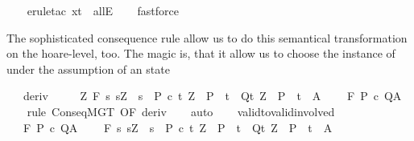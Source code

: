 \begin{isabellebody}
\ \ \isamarkupfalse%
\ {\isacharparenleft}erule{\isacharunderscore}tac\ x{\isacharequal}t\ \ allE{\isacharparenright}\isanewline
\ \ \isamarkupfalse%
\ fastforce\isanewline
\ \ \isamarkupfalse%
%
\endisatagproof
{\isafoldproof}%
%
\isadelimproof
%
\endisadelimproof
%
\begin{isamarkuptext}%
The sophisticated consequence rule allow us to do this 
        semantical transformation on the hoare-level, too. 
        The magic is, that it allow us to
        choose the instance of  under the assumption of an state %
\end{isamarkuptext}\isamarkuptrue%
\isamarkupfalse%
\isanewline
\ \ \ deriv{\isacharcolon}\ \isanewline
\ \ \ \ {\isachardoublequoteopen}{\isasymforall}Z{\isachardot}\ {\isasymGamma}{\isacharcomma}{\isacharbraceleft}{\isacharbraceright}{\isasymturnstile}\isactrlbsub {\isacharslash}F\isactrlesub \ {\isacharbraceleft}s{\isachardot}\ s{\isacharequal}Z\ {\isasymand}\ s\ {\isasymin}\ P{\isacharbraceright}\ c\ {\isacharbraceleft}t{\isachardot}\ Z\ {\isasymin}\ P\ {\isasymlongrightarrow}\ t\ {\isasymin}\ Q{\isacharbraceright}{\isacharcomma}{\isacharbraceleft}t{\isachardot}\ Z\ {\isasymin}\ P\ {\isasymlongrightarrow}\ t\ {\isasymin}\ A{\isacharbraceright}{\isachardoublequoteclose}\isanewline
\ \ \ {\isachardoublequoteopen}{\isasymGamma}{\isacharcomma}{\isacharbraceleft}{\isacharbraceright}\ {\isasymturnstile}\isactrlbsub {\isacharslash}F\isactrlesub \ P\ c\ Q{\isacharcomma}A{\isachardoublequoteclose}\isanewline
%
\isadelimproof
\ \ %
\endisadelimproof
%
\isatagproof
{}\isamarkupfalse%
\ {\isacharparenleft}rule\ ConseqMGT\ {\isacharbrackleft}OF\ deriv{\isacharbrackright}{\isacharparenright}\isanewline
\ \ \isamarkupfalse%
\ auto\isanewline
\ \ \isamarkupfalse%
%
\endisatagproof
{\isafoldproof}%
%
\isadelimproof
\isanewline
%
\endisadelimproof
\isanewline
{}\isamarkupfalse%
\ valid{\isacharunderscore}to{\isacharunderscore}valid{\isacharunderscore}involved{\isacharcolon}\isanewline
\ \ {\isachardoublequoteopen}{\isasymGamma}\ {\isasymTurnstile}\isactrlbsub {\isacharslash}F\isactrlesub \ P\ c\ Q{\isacharcomma}A\ {\isasymLongrightarrow}\isanewline
\ \ \ {\isasymGamma}{\isasymTurnstile}\isactrlbsub {\isacharslash}F\isactrlesub \ {\isacharbraceleft}s{\isachardot}\ s{\isacharequal}Z\ {\isasymand}\ s\ {\isasymin}\ P{\isacharbraceright}\ c\ {\isacharbraceleft}t{\isachardot}\ Z\ {\isasymin}\ P\ {\isasymlongrightarrow}\ t\ {\isasymin}\ Q{\isacharbraceright}{\isacharcomma}{\isacharbraceleft}t{\isachardot}\ Z\ {\isasymin}\ P\ {\isasymlongrightarrow}\ t\ {\isasymin}\ A{\isacharbraceright}{\isachardoublequoteclose}\isanewline

\end{isabellebody}
